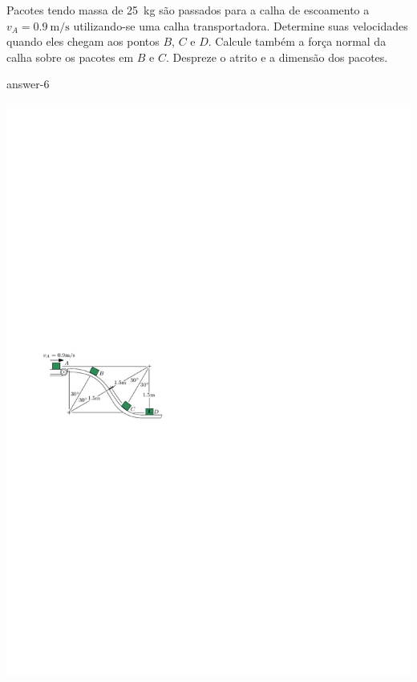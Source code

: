 
\item Pacotes tendo massa de \SI{25}{\kilogram} são passados para a calha de escoamento a $v_{A}=\SI{0.9}{\meter/\second}$ utilizando-se uma calha transportadora. Determine suas velocidades quando eles chegam aos pontos $B$, $C$ e $D$. Calcule também a força normal da calha sobre os pacotes em $B$ e $C$. Despreze o atrito e a dimensão dos pacotes.

{answer-6}

\vspace{-3.7cm}
\begin{flushright}
    \includegraphics[scale=1.7]{images/draw_6.pdf}
\end{flushright}
